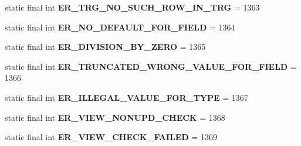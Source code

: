 \begin{DoxyCompactItemize}
static final int {\bfseries E\+R\+\_\+\+T\+R\+G\+\_\+\+N\+O\+\_\+\+S\+U\+C\+H\+\_\+\+R\+O\+W\+\_\+\+I\+N\+\_\+\+T\+RG} = 1363
\item 
\mbox{\label{classcom_1_1mysql_1_1cj_1_1exceptions_1_1_mysql_error_numbers_a7e9ddd5d5ab565055cf66bcb44b3e0ca}} 
static final int {\bfseries E\+R\+\_\+\+N\+O\+\_\+\+D\+E\+F\+A\+U\+L\+T\+\_\+\+F\+O\+R\+\_\+\+F\+I\+E\+LD} = 1364
\item 
\mbox{\label{classcom_1_1mysql_1_1cj_1_1exceptions_1_1_mysql_error_numbers_a83ca6007c34ccde8de3f6606489b6e07}} 
static final int {\bfseries E\+R\+\_\+\+D\+I\+V\+I\+S\+I\+O\+N\+\_\+\+B\+Y\+\_\+\+Z\+E\+RO} = 1365
\item 
\mbox{\label{classcom_1_1mysql_1_1cj_1_1exceptions_1_1_mysql_error_numbers_a77233ffc45a664f14512e312b40ab98a}} 
static final int {\bfseries E\+R\+\_\+\+T\+R\+U\+N\+C\+A\+T\+E\+D\+\_\+\+W\+R\+O\+N\+G\+\_\+\+V\+A\+L\+U\+E\+\_\+\+F\+O\+R\+\_\+\+F\+I\+E\+LD} = 1366
\item 
\mbox{\label{classcom_1_1mysql_1_1cj_1_1exceptions_1_1_mysql_error_numbers_ac859507c98a0687488f1f13d41214f82}} 
static final int {\bfseries E\+R\+\_\+\+I\+L\+L\+E\+G\+A\+L\+\_\+\+V\+A\+L\+U\+E\+\_\+\+F\+O\+R\+\_\+\+T\+Y\+PE} = 1367
\item 
\mbox{\label{classcom_1_1mysql_1_1cj_1_1exceptions_1_1_mysql_error_numbers_ae8d136c4f25b1ce24d67c8cc38f96151}} 
static final int {\bfseries E\+R\+\_\+\+V\+I\+E\+W\+\_\+\+N\+O\+N\+U\+P\+D\+\_\+\+C\+H\+E\+CK} = 1368
\item 
\mbox{\label{classcom_1_1mysql_1_1cj_1_1exceptions_1_1_mysql_error_numbers_aa764a951b17034efb4eb96a1605380ff}} 
static final int {\bfseries E\+R\+\_\+\+V\+I\+E\+W\+\_\+\+C\+H\+E\+C\+K\+\_\+\+F\+A\+I\+L\+ED} = 1369
\item 
\mbox{\label{classcom_1_1mysql_1_1cj_1_1exceptions_1_1_mysql_error_numbers_a336014e6ad6bfc7f88c22e28f57dae69}} 

\end{DoxyCompactItemize}
